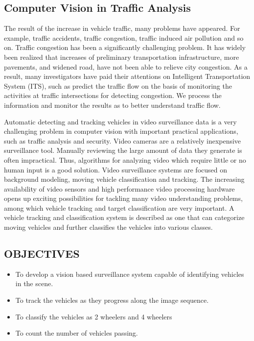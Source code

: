 \documentclass[12pt, a4paper]{article}
\begin{document}
\begin{large}\subsection{Computer Vision in Traffic Analysis}\end{large}
\hspace{3cm}
The result of the increase in vehicle traffic, many problems have appeared. For example,
traffic accidents, traffic congestion, traffic induced air pollution and so on. Traffic congestion has been a significantly challenging problem. It has widely been realized that increases of preliminary transportation infrastructure, more pavements, and widened road, have not been able to relieve city congestion. As a result, many investigators have paid their attentions on Intelligent Transportation System (ITS), such as predict the traffic flow on the basis of monitoring the activities at traffic intersections for detecting congestion. We process the information and monitor the results as to better understand traffic flow.
\par
Automatic detecting and tracking vehicles in video surveillance data is a very challenging
problem in computer vision with important practical applications, such as traffic analysis and security. Video cameras are a relatively inexpensive surveillance tool. Manually reviewing the large amount of data they generate is often impractical. Thus, algorithms for analyzing video which require little or no human input is a good solution. Video surveillance systems are focused on background modeling, moving vehicle classification and tracking. The increasing availability of video sensors and high performance video processing hardware opens up exciting possibilities for tackling many video understanding problems, among which vehicle tracking and target classification are very important. A vehicle tracking and classification system is described as one that can categorize moving vehicles and further classifies the vehicles into various classes.


\newpage
\begin{Large}\section{OBJECTIVES}\end{Large}
\hspace{3cm}
\begin{itemize}
\item To develop a vision based surveillance system capable of identifying vehicles in the scene.
\item To track the vehicles as they progress along the image sequence.
\item To classify the vehicles as 2 wheelers and 4 wheelers
\item To count the number of vehicles passing.
\end{itemize}
\end{document}
